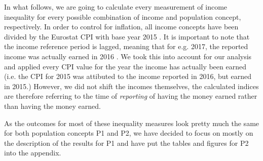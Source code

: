 \documentclass[a4paper]{article}\usepackage[]{graphicx}\usepackage[]{color}
\begin{document}
In what follows, we are going to calculate every measurement of income inequality for every possible combination of income and population concept, respectively. In order to control for inflation, all income concepts have been divided by the Eurostat CPI with base year 2015 \parencite{eurostat_cpi}. It is important to note that the income reference period is lagged, meaning that for e.g. 2017, the reported income was actually earned in 2016 \parencite{eurostat2}. We took this into account for our analysis and applied every CPI value for the year the income has actually been earned (i.e. the CPI for 2015 was attibuted to the income reported in 2016, but earned in 2015.) However, we did not shift the incomes themselves, the calculated indices are therefore referring to the time of \textit{reporting} of having the money earned rather than having the money earned.

As the outcomes for most of these inequality measures look pretty much the same for both population concepts P1 and P2, we have decided to focus on mostly on the description of the results for P1 and have put the tables and figures for P2 into the appendix. 
\end{document}
